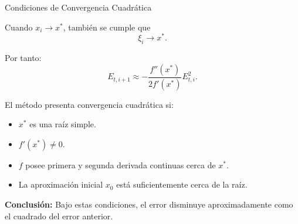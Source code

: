 \documentclass[../../main.tex]{subfiles}
\begin{document}
\begin{frame}{Condiciones de Convergencia Cuadrática}

Cuando \(x_i\to x^*\), también se cumple que
\[
\xi_i\to x^*.
\]

Por tanto:
\[
E_{t,i+1}
\approx
-\frac{f''(x^*)}{2f'(x^*)}E_{t,i}^2.
\]

El método presenta convergencia cuadrática si:

\begin{itemize}
  \item \(x^*\) es una raíz simple.
  \item \(f'(x^*)\neq0\).
  \item \(f\) posee primera y segunda derivada continuas
        cerca de \(x^*\).
  \item La aproximación inicial \(x_0\) está suficientemente
        cerca de la raíz.
\end{itemize}

\textbf{Conclusión:}
Bajo estas condiciones, el error disminuye aproximadamente como
el cuadrado del error anterior.

\end{frame}


\end{document}
